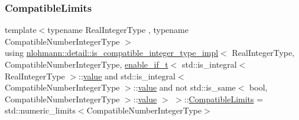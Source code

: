 \subsubsection{\texorpdfstring{CompatibleLimits}{CompatibleLimits}}
{\footnotesize\ttfamily template$<$typename Real\+Integer\+Type , typename Compatible\+Number\+Integer\+Type $>$ \\
using \mbox{\hyperlink{structnlohmann_1_1detail_1_1is__compatible__integer__type__impl}{nlohmann\+::detail\+::is\+\_\+compatible\+\_\+integer\+\_\+type\+\_\+impl}}$<$ Real\+Integer\+Type, Compatible\+Number\+Integer\+Type, \mbox{\hyperlink{namespacenlohmann_1_1detail_a02bcbc878bee413f25b985ada771aa9c}{enable\+\_\+if\+\_\+t}}$<$ std\+::is\+\_\+integral$<$ Real\+Integer\+Type $>$\+::\mbox{\hyperlink{structnlohmann_1_1detail_1_1is__compatible__integer__type__impl_3_01_real_integer_type_00_01_com5aa74bcf254245a639da00509f4d2655_a478242daac7a70e28c749bfec00d1c1b}{value}} and std\+::is\+\_\+integral$<$ Compatible\+Number\+Integer\+Type $>$\+::\mbox{\hyperlink{structnlohmann_1_1detail_1_1is__compatible__integer__type__impl_3_01_real_integer_type_00_01_com5aa74bcf254245a639da00509f4d2655_a478242daac7a70e28c749bfec00d1c1b}{value}} and not std\+::is\+\_\+same$<$ bool, Compatible\+Number\+Integer\+Type $>$\+::\mbox{\hyperlink{structnlohmann_1_1detail_1_1is__compatible__integer__type__impl_3_01_real_integer_type_00_01_com5aa74bcf254245a639da00509f4d2655_a478242daac7a70e28c749bfec00d1c1b}{value}} $>$ $>$\+::\mbox{\hyperlink{structnlohmann_1_1detail_1_1is__compatible__integer__type__impl_3_01_real_integer_type_00_01_com5aa74bcf254245a639da00509f4d2655_a002983b5c7c0f72b89d2151a6b39627d}{Compatible\+Limits}} =  std\+::numeric\+\_\+limits$<$Compatible\+Number\+Integer\+Type$>$}

